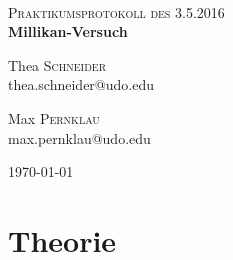 

\newcommand{\HRule}{\rule{\linewidth}{0.5mm}}


\begin{titlepage}
\begin{center}

~\\[1cm]


\textsc{\Large Praktikumsprotokoll des 3.5.2016}\\

\huge{ \bfseries Millikan-Versuch}\\[1em]


\begin{minipage}{0.4\textwidth}
\begin{flushleft} \large
Thea \textsc{Schneider}\\
thea.schneider@udo.edu
\end{flushleft}
\end{minipage}
\begin{minipage}{0.4\textwidth}
\begin{flushright} \large
Max \textsc{Pernklau}\\
max.pernklau@udo.edu
\end{flushright}
\end{minipage}

\vfill

{\large \today}

\end{center}
\end{titlepage}


\thispagestyle{empty}



\begingroup
\renewcommand{\clearpage}{}
\section{Theorie}
\label{sec:Theorie}
\endgroup









